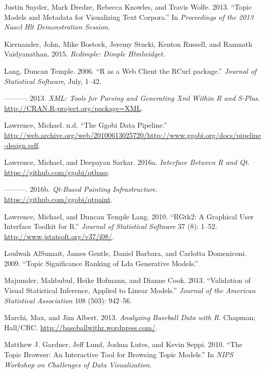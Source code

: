 \documentclass[12pt,]{isuthesis}
\begin{document}
\hypertarget{ref-Snyder}{}
Justin Snyder, Mark Dredze, Rebecca Knowles, and Travis Wolfe. 2013.
``Topic Models and Metadata for Visualizing Text Corpora.'' In
\emph{Proceedings of the 2013 Naacl Hlt Demonstration Session}.

\hypertarget{ref-rcdimple}{}
Kiernander, John, Mike Bostock, Jeremy Stucki, Kenton Russell, and
Ramnath Vaidyanathan. 2015. \emph{Rcdimple: Dimple Htmlwidget}.

\hypertarget{ref-Lang:2006us}{}
Lang, Duncan Temple. 2006. ``R as a Web Client the RCurl package.''
\emph{Journal of Statistical Software}, July, 1--42.

\hypertarget{ref-XML}{}
---------. 2013. \emph{XML: Tools for Parsing and Generating Xml Within
R and S-Plus}. \url{http://CRAN.R-project.org/package=XML}.

\hypertarget{ref-ggobi-pipeline-design}{}
Lawrence, Michael. n.d. ``The Ggobi Data Pipeline.''
\url{http://web.archive.org/web/20100613025720/http://www.ggobi.org/docs/pipeline-design.pdf}.

\hypertarget{ref-qtbase}{}
Lawrence, Michael, and Deepayan Sarkar. 2016a. \emph{Interface Between R
and Qt}. \url{https://github.com/ggobi/qtbase}.

\hypertarget{ref-qtpaint}{}
---------. 2016b. \emph{Qt-Based Painting Infrastructure}.
\url{https://github.com/ggobi/qtpaint}.

\hypertarget{ref-RGtk2}{}
Lawrence, Michael, and Duncan Temple Lang. 2010. ``RGtk2: A Graphical
User Interface Toolkit for R.'' \emph{Journal of Statistical Software}
37 (8): 1--52. \url{http://www.jstatsoft.org/v37/i08/}.

\hypertarget{ref-AlSumait}{}
Loulwah AlSumait, James Gentle, Daniel Barbara, and Carlotta Domeniconi.
2009. ``Topic Significance Ranking of Lda Generative Models.''

\hypertarget{ref-Majumder:2013ie}{}
Majumder, Mahbubul, Heike Hofmann, and Dianne Cook. 2013. ``Validation
of Visual Statistical Inference, Applied to Linear Models.''
\emph{Journal of the American Statistical Association} 108 (503):
942--56.

\hypertarget{ref-baseball}{}
Marchi, Max, and Jim Albert. 2013. \emph{Analyzing Baseball Data with
R}. Chapman; Hall/CRC. \url{http://baseballwithr.wordpress.com/}.

\hypertarget{ref-Gardner}{}
Matthew J. Gardner, Jeff Lund, Joshua Lutes, and Kevin Seppi. 2010.
``The Topic Browser: An Interactive Tool for Browsing Topic Models.'' In
\emph{NIPS Workshop on Challenges of Data Visualization}.
\end{document}
